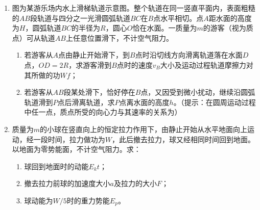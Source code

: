 \begin{enumerate}[leftmargin=0em]
\item 
{}
图为某游乐场内水上滑梯轨道示意图。整个轨道在同一竖直平面内，表面粗糙的$ AB $段轨道与四分之一光滑圆弧轨道$ BC $在$ B $点水平相切。点$ A $距水面的高度为$ H $，圆弧轨道$ BC $的半径为$ R $，圆心$ O $恰在水面。一质量为$ m $的游客（视为质点）可从轨道$ AB $上任意位置滑下，不计空气阻力。
\begin{enumerate}
\renewcommand{\labelenumi}{\arabic{enumi}.}
\item
若游客从$ A $点由静止开始滑下，到$ B $点时沿切线方向滑离轨道落在水面$ D $点，$ OD=2R $，求游客滑到$ B $点时的速度$ v_{B} $大小及运动过程轨道摩擦力对其所做的功$ Wf $；
\item 
若游客从$ AB $段某处滑下，恰好停在$ B $点，又因受到微小扰动，继续沿圆弧轨道滑到$ P $点后滑离轨道，求$ P $点离水面的高度$ h $。（提示：在圆周运动过程中任一点，质点所受的向心力与其速率的关系为）



\end{enumerate}
\begin{figure}[h!]
\flushright

\end{figure}




\newpage
\item 
{}
质量为$ m $的小球在竖直向上的恒定拉力作用下，由静止开始从水平地面向上运动，经一段时间，拉力做功为$ W $，此后撤去拉力，球又经相同时间回到地面。以地面为零势能面，不计空气阻力。求：
\begin{enumerate}
\renewcommand{\labelenumi}{\arabic{enumi}.}
\item
球回到地面时的动能$ E_{k} t $；
\item 
撤去拉力前球的加速度大小$ a $及拉力的大小$ F $；
\item 
球动能为$ W/5 $时的重力势能$ E_{p} $。




\end{enumerate}
\end{enumerate}
